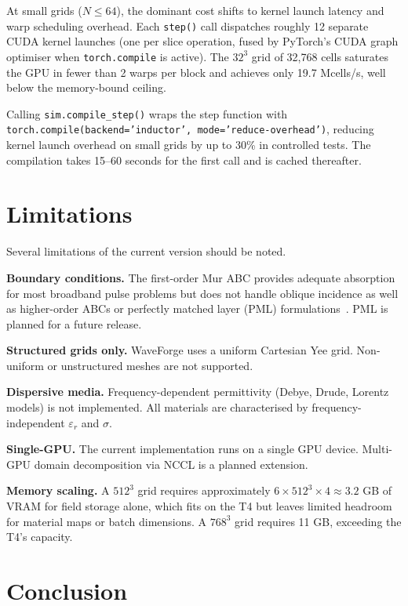 \documentclass[10pt,twocolumn]{article}
\begin{document}
At small grids ($N \leq 64$), the dominant cost shifts to kernel launch
latency and warp scheduling overhead. Each \texttt{step()} call dispatches
roughly 12 separate CUDA kernel launches (one per slice operation, fused
by PyTorch's CUDA graph optimiser when \texttt{torch.compile} is active).
The $32^3$ grid of 32{,}768 cells saturates the GPU in fewer than 2 warps
per block and achieves only 19.7 Mcells/s, well below the memory-bound
ceiling.

Calling \texttt{sim.compile\_step()} wraps the step function with
\texttt{torch.compile(backend='inductor', mode='reduce-overhead')}, reducing
kernel launch overhead on small grids by up to 30\% in controlled tests.
The compilation takes 15--60 seconds for the first call and is cached
thereafter.

\section{Limitations}
\label{sec:limitations}

Several limitations of the current version should be noted.

\textbf{Boundary conditions.} The first-order Mur ABC provides adequate
absorption for most broadband pulse problems but does not handle oblique
incidence as well as higher-order ABCs or perfectly matched layer (PML)
formulations~\cite{taflove2005computational}. PML is planned for a future
release.

\textbf{Structured grids only.} WaveForge uses a uniform Cartesian Yee
grid. Non-uniform or unstructured meshes are not supported.

\textbf{Dispersive media.} Frequency-dependent permittivity (Debye, Drude,
Lorentz models) is not implemented. All materials are characterised by
frequency-independent $\varepsilon_r$ and $\sigma$.

\textbf{Single-GPU.} The current implementation runs on a single GPU device.
Multi-GPU domain decomposition via NCCL is a planned extension.

\textbf{Memory scaling.} A $512^3$ grid requires approximately
$6 \times 512^3 \times 4 \approx 3.2$ GB of VRAM for field storage alone,
which fits on the T4 but leaves limited headroom for material maps or batch
dimensions. A $768^3$ grid requires 11 GB, exceeding the T4's capacity.

\section{Conclusion}
\label{sec:conclusion}
\end{document}
